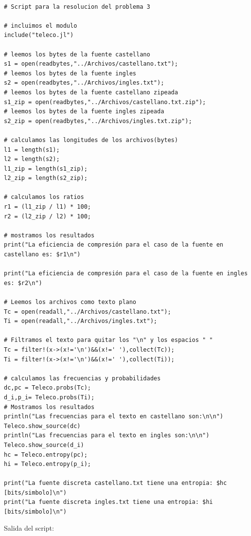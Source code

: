 \documentclass[10pt]{article}
\begin{document}
\begin{verbatim}

# Script para la resolucion del problema 3

# incluimos el modulo
include("teleco.jl")

# leemos los bytes de la fuente castellano
s1 = open(readbytes,"../Archivos/castellano.txt");
# leemos los bytes de la fuente ingles
s2 = open(readbytes,"../Archivos/ingles.txt");
# leemos los bytes de la fuente castellano zipeada
s1_zip = open(readbytes,"../Archivos/castellano.txt.zip");
# leemos los bytes de la fuente ingles zipeada
s2_zip = open(readbytes,"../Archivos/ingles.txt.zip");

# calculamos las longitudes de los archivos(bytes)
l1 = length(s1);
l2 = length(s2);
l1_zip = length(s1_zip);
l2_zip = length(s2_zip);

# calculamos los ratios
r1 = (l1_zip / l1) * 100;
r2 = (l2_zip / l2) * 100;

# mostramos los resultados
print("La eficiencia de compresión para el caso de la fuente en castellano es: $r1\n")

print("La eficiencia de compresión para el caso de la fuente en ingles es: $r2\n")

# Leemos los archivos como texto plano
Tc = open(readall,"../Archivos/castellano.txt");
Ti = open(readall,"../Archivos/ingles.txt");

# Filtramos el texto para quitar los "\n" y los espacios " "
Tc = filter!(x->(x!='\n')&&(x!=' '),collect(Tc));
Ti = filter!(x->(x!='\n')&&(x!=' '),collect(Ti));

# calculamos las frecuencias y probabilidades 
dc,pc = Teleco.probs(Tc);
d_i,p_i= Teleco.probs(Ti);
# Mostramos los resultados
println("Las frecuencias para el texto en castellano son:\n\n")
Teleco.show_source(dc)
println("Las frecuencias para el texto en ingles son:\n\n")
Teleco.show_source(d_i)
hc = Teleco.entropy(pc);
hi = Teleco.entropy(p_i);

print("La fuente discreta castellano.txt tiene una entropia: $hc [bits/simbolo]\n")
print("La fuente discreta ingles.txt tiene una entropia: $hi [bits/simbolo]\n")
\end{verbatim}

Salida del script:
\end{document}
